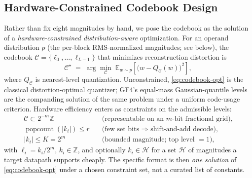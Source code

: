 \subsection{Hardware-Constrained Codebook Design}\label{subsec:codebook-design}

Rather than fix eight magnitudes by hand, we pose the codebook as the solution of
a \emph{hardware-constrained distribution-aware} optimization. For an operand
distribution $p$ (the per-block RMS-normalized magnitudes; see below), the
codebook $\mathcal{C}=\{\ell_0,\dots,\ell_{L-1}\}$ that minimizes reconstruction
distortion is
\begin{equation}
  \mathcal{C}^\star \;=\; \arg\min_{\mathcal{C}}\;
  \mathbb{E}_{w\sim p}\!\left[\bigl(w - Q_{\mathcal{C}}(w)\bigr)^2\right],
  \label{eq:codebook-opt}
\end{equation}
where $Q_{\mathcal{C}}$ is nearest-level quantization. Unconstrained,
\eqref{eq:codebook-opt} is the classical distortion-optimal quantizer; GF4's
equal-mass Gaussian-quantile levels are the companding solution of the same
problem under a uniform code-usage criterion. Hardware efficiency enters as
constraints on the admissible levels:
\begin{align}
  \mathcal{C}\subset 2^{-m}\mathbb{Z}
    &\quad\text{(representable on an $m$-bit fractional grid),}
    \label{eq:c-grid}\\
  \operatorname{popcount}(|k_i|)\le r
    &\quad\text{(few set bits $\Rightarrow$ shift-and-add decode),}
    \label{eq:c-pop}\\
  |k_i|\le K=2^{m}
    &\quad\text{(bounded magnitude; top level $=1$),}
    \label{eq:c-mag}
\end{align}
with $\ell_i = k_i/2^m$, $k_i\in\mathbb{Z}$, and optionally $k_i\in\mathcal{H}$
for a set $\mathcal{H}$ of magnitudes a target datapath supports cheaply. The
specific format is then \emph{one solution} of \eqref{eq:codebook-opt} under a
chosen constraint set, not a curated list of constants.


